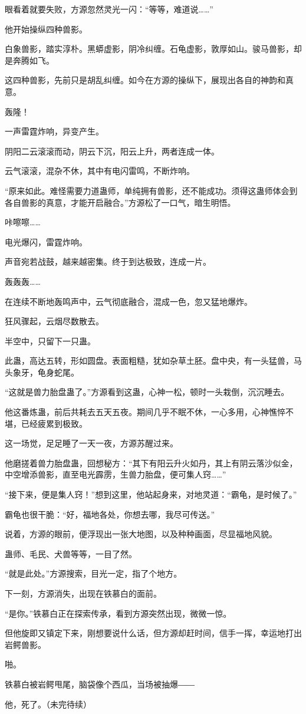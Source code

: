 \begin{this_body}
眼看着就要失败，方源忽然灵光一闪：“等等，难道说……”

他开始操纵四种兽影。

白象兽影，踏实淳朴。黑蟒虚影，阴冷纠缠。石龟虚影，敦厚如山。骏马兽影，却是奔腾如飞。

这四种兽影，先前只是胡乱纠缠。如今在方源的操纵下，展现出各自的神韵和真意。

轰隆！

一声雷霆炸响，异变产生。

阴阳二云滚滚而动，阴云下沉，阳云上升，两者连成一体。

云气滚滚，混杂不休，其中有电闪雷鸣，不断炸响。

“原来如此。难怪需要力道蛊师，单纯拥有兽影，还不能成功。须得这蛊师体会到各自兽影的真意，才能开启融合。”方源松了一口气，暗生明悟。

咔嚓嚓……

电光爆闪，雷霆炸响。

声音宛若战鼓，越来越密集。终于到达极致，连成一片。

轰轰轰……

在连续不断地轰鸣声中，云气彻底融合，混成一色，忽又猛地爆炸。

狂风骤起，云烟尽数散去。

半空中，只留下一只蛊。

此蛊，高达五转，形如圆盘。表面粗糙，犹如杂草土胚。盘中央，有一头猛兽，马头象牙，龟身蛇尾。

“这就是兽力胎盘蛊了。”方源看到这蛊，心神一松，顿时一头栽倒，沉沉睡去。

他这番炼蛊，前后共耗去五天五夜。期间几乎不眠不休，一心多用，心神憔悴不堪，已经疲累到极致。

这一场觉，足足睡了一天一夜，方源苏醒过来。

他磨搓着兽力胎盘蛊，回想秘方：“其下有阳云升火如丹，其上有阴云落沙似金，中空增添兽影，直至电光霹雳，生兽力胎盘，便可集人窍……”

“接下来，便是集人窍！”想到这里，他站起身来，对地灵道：“霸龟，是时候了。”

霸龟也很干脆：“好，福地各处，你想去哪，我尽可传送。”

说着，方源的眼前，便浮现出一张大地图，以及种种画面，尽显福地风貌。

蛊师、毛民、犬兽等等，一目了然。

“就是此处。”方源搜索，目光一定，指了个地方。

下一刻，方源消失，出现在铁慕白的面前。

“是你。”铁慕白正在探索传承，看到方源突然出现，微微一惊。

但他旋即又镇定下来，刚想要说什么话，但方源却赶时间，信手一挥，幸运地打出岩鳄兽影。

啪。

铁慕白被岩鳄甩尾，脑袋像个西瓜，当场被抽爆――

他，死了。（未完待续）

\end{this_body}

